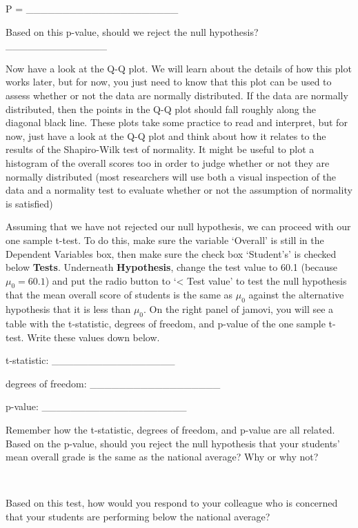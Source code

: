 \documentclass[
  openany]{scrbook}
\begin{document}
P = \_\_\_\_\_\_\_\_\_\_\_\_\_\_\_\_\_\_\_\_\_

Based on this p-value, should we reject the null hypothesis? \_\_\_\_\_\_\_\_\_\_\_\_\_\_

Now have a look at the Q-Q plot.
We will learn about the details of how this plot works later, but for now, you just need to know that this plot can be used to assess whether or not the data are normally distributed.
If the data are normally distributed, then the points in the Q-Q plot should fall roughly along the diagonal black line.
These plots take some practice to read and interpret, but for now, just have a look at the Q-Q plot and think about how it relates to the results of the Shapiro-Wilk test of normality.
It might be useful to plot a histogram of the overall scores too in order to judge whether or not they are normally distributed (most researchers will use both a visual inspection of the data and a normality test to evaluate whether or not the assumption of normality is satisfied)

Assuming that we have not rejected our null hypothesis, we can proceed with our one sample t-test.
To do this, make sure the variable `Overall' is still in the Dependent Variables box, then make sure the check box `Student's' is checked below \textbf{Tests}.
Underneath \textbf{Hypothesis}, change the test value to 60.1 (because \(\mu_{0} = 60.1\)) and put the radio button to `\textless{} Test value' to test the null hypothesis that the mean overall score of students is the same as \(\mu_{0}\) against the alternative hypothesis that it is less than \(\mu_{0}\).
On the right panel of jamovi, you will see a table with the t-statistic, degrees of freedom, and p-value of the one sample t-test.
Write these values down below.

t-statistic: \_\_\_\_\_\_\_\_\_\_\_\_\_\_\_\_\_

degrees of freedom: \_\_\_\_\_\_\_\_\_\_\_\_\_\_\_\_\_\_

p-value: \_\_\_\_\_\_\_\_\_\_\_\_\_\_\_\_\_\_\_\_

Remember how the t-statistic, degrees of freedom, and p-value are all related.
Based on the p-value, should you reject the null hypothesis that your students' mean overall grade is the same as the national average?
Why or why not?

\begin{verbatim}


\end{verbatim}

Based on this test, how would you respond to your colleague who is concerned that your students are performing below the national average?
\end{document}
